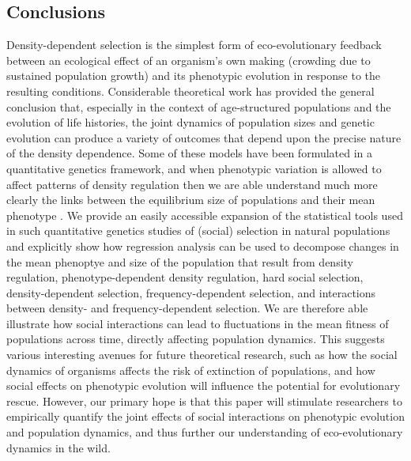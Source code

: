 \documentclass{article}
\begin{document}
\subsection{Conclusions}
Density-dependent selection is the simplest form of eco-evolutionary feedback between an ecological effect of an organism’s own making (crowding due to sustained population growth) and its phenotypic evolution in response to the resulting conditions. Considerable theoretical work has provided the general conclusion that, especially in the context of age-structured populations and the evolution of life histories, the joint dynamics of population sizes and genetic evolution can produce a variety of outcomes that depend upon the precise nature of the density dependence. Some of these models have been formulated in a quantitative genetics framework, and when phenotypic variation is allowed to affect patterns of density regulation then we are able understand much more clearly the links between the equilibrium size of populations and their mean phenotype \citep{Engen2020}. We provide an easily accessible expansion of the statistical tools used in such quantitative genetics studies of (social) selection in natural populations and explicitly show how regression analysis can be used to decompose changes in the mean phenoptye and size of the population that result from density regulation, phenotype-dependent density regulation, hard social selection, density-dependent selection, frequency-dependent selection, and interactions between density- and frequency-dependent selection. We are therefore able illustrate how social interactions can lead to fluctuations in the mean fitness of populations across time, directly affecting population dynamics. This suggests various interesting avenues for future theoretical research, such as how the social dynamics of organisms affects the risk of extinction of populations, and how social effects on phenotypic evolution will influence the potential for evolutionary rescue. However, our primary hope is that this paper will stimulate researchers to empirically quantify the joint effects of social interactions on phenotypic evolution and population dynamics, and thus further our understanding of eco-evolutionary dynamics in the wild.



  
\end{document}
